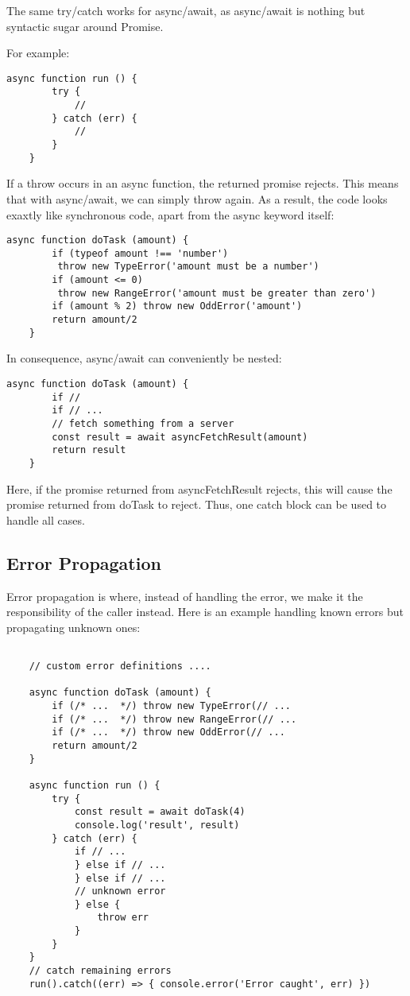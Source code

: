 \documentclass{scrartcl}
\begin{document}
The same try/catch works for async/await, as async/await is nothing but syntactic sugar around Promise.

For example:

\begin{lstlisting}[style=ES6]
    async function run () {
        try {
            //
        } catch (err) {
            //
        }
    }
\end{lstlisting}

If a throw occurs in an async function, the returned promise rejects. This means that with async/await, we can simply throw again. As a result, the code looks exaxtly like synchronous code, apart from the async keyword itself:

\begin{lstlisting}[style=ES6]
    async function doTask (amount) {
        if (typeof amount !== 'number')
         throw new TypeError('amount must be a number')
        if (amount <= 0)
         throw new RangeError('amount must be greater than zero')
        if (amount % 2) throw new OddError('amount')
        return amount/2
    }
\end{lstlisting}

In consequence, async/await can conveniently be nested:

\begin{lstlisting}[style=ES6]
    async function doTask (amount) {
        if //
        if // ...
        // fetch something from a server
        const result = await asyncFetchResult(amount)
        return result
    }
\end{lstlisting}

    Here, if the promise returned from asyncFetchResult rejects, this will cause the promise returned from doTask to reject.
    Thus, one catch block can be used to handle all cases.


\subsection{Error Propagation}

Error propagation is where, instead of handling the error, we make it the responsibility of the caller instead. Here is an example handling known errors but propagating unknown ones:

\begin{lstlisting}[style=ES6]

    // custom error definitions ....

    async function doTask (amount) {
        if (/* ...  */) throw new TypeError(// ...
        if (/* ...  */) throw new RangeError(// ...
        if (/* ...  */) throw new OddError(// ...
        return amount/2
    }

    async function run () {
        try {
            const result = await doTask(4)
            console.log('result', result)
        } catch (err) {
            if // ...
            } else if // ...
            } else if // ...
            // unknown error
            } else {
                throw err
            }
        }
    }
    // catch remaining errors
    run().catch((err) => { console.error('Error caught', err) })
\end{lstlisting}
\end{document}

